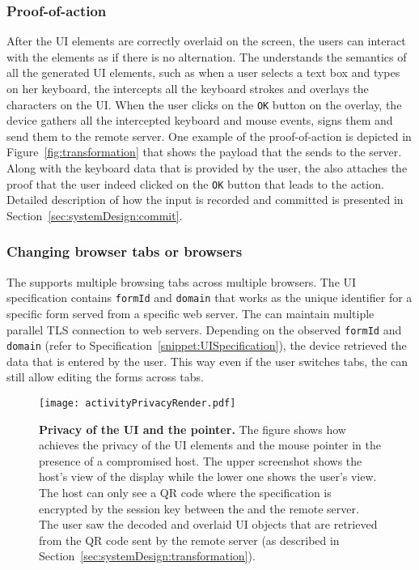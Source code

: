 \subsubsection{Proof-of-action} After the UI elements are correctly overlaid on the screen, the users can interact with the elements as if there is no alternation. The \device understands the semantics of all the generated UI elements, such as when a user selects a text box and types on her keyboard, the \device intercepts all the keyboard strokes and overlays the characters on the UI. When the user clicks on the \texttt{OK} button on the overlay, the device gathers all the intercepted keyboard and mouse events, signs them and send them to the remote server. One example of the proof-of-action is depicted in Figure~\ref{fig:transformation} that shows the payload that the \device sends to the server. Along with the keyboard data that is provided by the user, the \device also attaches the proof that the user indeed clicked on the \texttt{OK} button that leads to the action. Detailed description of how the input is recorded and committed is presented in Section~\ref{sec:systemDesign:commit}.


\subsubsection{Changing browser tabs or browsers}
The \device supports multiple browsing tabs across multiple browsers. The UI specification contains \texttt{formId} and \texttt{domain} that works as the unique identifier for a specific form served from a specific web server. The \device can maintain multiple parallel TLS connection to web servers. Depending on the observed \texttt{formId} and \texttt{domain} (refer to Specification~\ref{snippet:UISpecification}), the device retrieved the data that is entered by the user. This way even if the user switches tabs, the \device can still allow editing the forms across tabs. 

\begin{figure}[t]
\centering
\texttt{[image: activityPrivacyRender.pdf]}
\caption{\textbf{Privacy of the UI and the pointer.} The figure shows how \name achieves the privacy of the UI elements and the mouse pointer in the presence of a compromised host. The upper screenshot shows the host's view of the display while the lower one shows the user's view. The host can only see a QR code where the specification is encrypted by the \tls session key between the \device and the remote server. The user saw the decoded and overlaid UI objects that are retrieved from the QR code sent by the remote server (as described in Section~\ref{sec:systemDesign:transformation}).}
\label{fig:activityPrivacy}
\centering
\end{figure}



